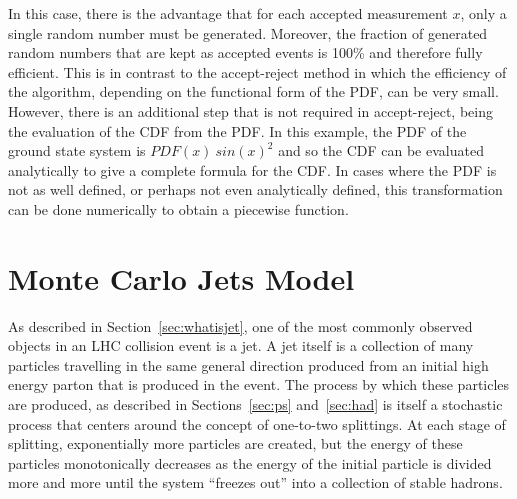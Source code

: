 \documentclass[UKenglish,texlive=2016]{\ATLASLATEXPATH atlasdoc}
\begin{document}
In this case, there is the advantage that for each accepted measurement $x$, only a single random number must be generated.  Moreover, the fraction of generated random numbers that are kept as accepted events is 100\% and therefore fully efficient.  This is in contrast to the accept-reject method in which the efficiency of the algorithm, depending on the functional form of the PDF, can be very small.  However, there is an additional step that is not required in accept-reject, being the evaluation of the CDF from the PDF.  In this example, the PDF of the ground state system is $PDF(x)~sin(x)^2$ and so the CDF can be evaluated analytically to give a complete formula for the CDF.  In cases where the PDF is not as well defined, or perhaps not even analytically defined, this transformation can be done numerically to obtain a piecewise function. 

\begin{center}
\end{center}

\begin{center}
\end{center}

\section{Monte Carlo Jets Model}
\label{sec:mcmodel}
As described in Section~\ref{sec:whatisjet}, one of the most commonly observed objects in an LHC collision event is a jet.  A jet itself is a collection of many particles travelling in the same general direction produced from an initial high energy parton that is produced in the event.  The process by which these particles are produced, as described in Sections~\ref{sec:ps} and~\ref{sec:had} is itself a stochastic process that centers around the concept of one-to-two splittings.  At each stage of splitting, exponentially more particles are created, but the energy of these particles monotonically decreases as the energy of the initial particle is divided more and more until the system ``freezes out'' into a collection of stable hadrons.  
\end{document}
